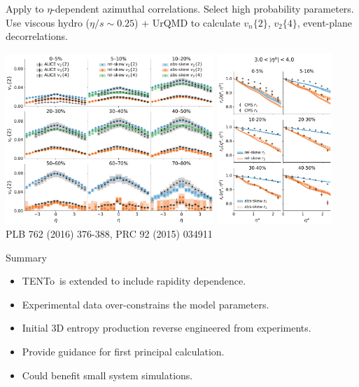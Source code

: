 \documentclass[11pt]{beamer}
\newcommand{\TRENTo}{T\raisebox{-0.2em}{R}ENTo~}
\begin{document}
\begin{frame}{Apply to $\eta$-dependent azimuthal correlations.}
Select high probability parameters. Use viscous hydro ($\eta/s \sim 0.25$) + UrQMD to calculate $v_n\{2\}$, $v_2\{4\}$, event-plane decorrelations.
\begin{center}
\includegraphics[width=0.59\textwidth]{vn_eta.pdf}\quad
\includegraphics[width=0.325\textwidth]{evt_pln_decorr_near.pdf}\\
\tiny PLB 762 (2016) 376-388, PRC 92 (2015) 034911
\end{center}
\end{frame}

\begin{frame}{Summary}
\begin{itemize}
\item \TRENTo is extended to include rapidity dependence.
\vspace*{0.5cm}
\item Experimental data over-constrains the model parameters.
\vspace*{0.5cm}
\item \colorbox{red!20}{Initial 3D entropy production reverse engineered
 from experiments.}
\vspace*{0.5cm}
\item \colorbox{blue!20}{Provide guidance for first principal calculation.}
\vspace*{0.5cm}
\item \colorbox{blue!20}{Could benefit small system simulations.}
\end{itemize}
\end{frame}
\end{document}
